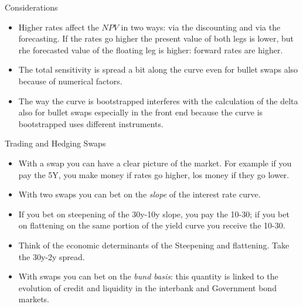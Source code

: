 \documentclass{beamer}
\begin{document}
\begin{frame}{Considerations}
	\begin{itemize}
		\item Higher rates affect the $NPV$ in two ways: via the discounting and via the forecasting. If the rates go higher the present value of both legs is lower, but rhe forecasted value of the floating leg is higher: forward rates are higher.
		\item The total sensitivity is spread a bit along the curve even for bullet swaps also because of numerical factors.
		\item The way the curve is bootstrapped interferes with the calculation of the delta also for bullet swaps especially in the front end because the curve is bootstrapped uses different instruments.
	\end{itemize}
\end{frame}

\begin{frame}{Trading and Hedging Swaps}
	\begin{itemize}
		\item With a swap you can have a clear picture of the market. For example if you pay the 5Y, you make money if rates go higher, los money if they go lower.
		\item With two swaps you can bet on the \emph{slope} of the interest rate curve.
		\item If you bet on steepening of the 30y-10y slope, you pay the 10-30; if you bet on flattening on the same portion of the yield curve you receive the 10-30.
		\item Think of the economic determinants of the Steepening and flattening. Take the 30y-2y spread.
		\item With swaps you can bet on the \emph{bund basis}: this quantity is linked to the evolution of credit and liquidity in the interbank and Government bond markets.
	\end{itemize}
\end{frame}
\end{document}
